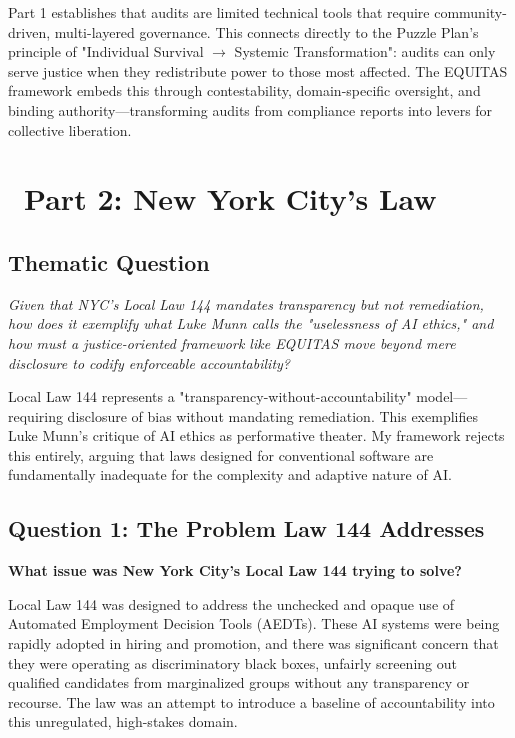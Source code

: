 \documentclass[12pt,letterpaper]{article}
\begin{document}
\begin{puzzleplan}
Part 1 establishes that audits are limited technical tools that require community-driven, multi-layered governance. This connects directly to the Puzzle Plan's principle of "Individual Survival $\rightarrow$ Systemic Transformation": audits can only serve justice when they redistribute power to those most affected. The EQUITAS framework embeds this through contestability, domain-specific oversight, and binding authority—transforming audits from compliance reports into levers for collective liberation.
\end{puzzleplan}

\newpage

\section*{\color{primaryblue}\faBalanceScale\ Part 2: New York City's Law}

\subsection*{Thematic Question}
\textit{Given that NYC's Local Law 144 mandates transparency but not remediation, how does it exemplify what Luke Munn calls the "uselessness of AI ethics," and how must a justice-oriented framework like EQUITAS move beyond mere disclosure to codify enforceable accountability?}

\begin{keyfindings}
Local Law 144 represents a "transparency-without-accountability" model—requiring disclosure of bias without mandating remediation. This exemplifies Luke Munn's critique of AI ethics as performative theater. My framework rejects this entirely, arguing that laws designed for conventional software are fundamentally inadequate for the complexity and adaptive nature of AI.
\end{keyfindings}

\subsection*{Question 1: The Problem Law 144 Addresses}
\textbf{What issue was New York City's Local Law 144 trying to solve?}

Local Law 144 was designed to address the unchecked and opaque use of Automated Employment Decision Tools (AEDTs). These AI systems were being rapidly adopted in hiring and promotion, and there was significant concern that they were operating as discriminatory black boxes, unfairly screening out qualified candidates from marginalized groups without any transparency or recourse. The law was an attempt to introduce a baseline of accountability into this unregulated, high-stakes domain.
\end{document}
